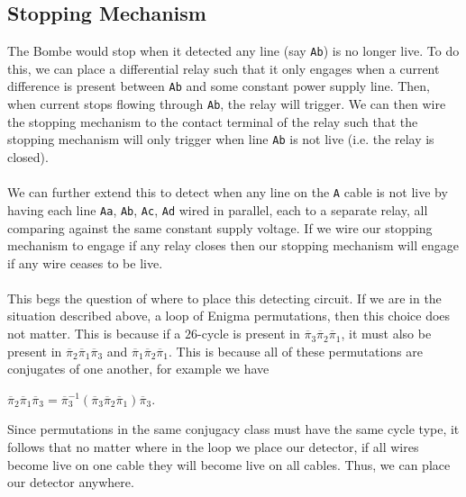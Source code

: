 \subsection{Stopping Mechanism}
The Bombe would stop when it detected
any line (say \texttt{Ab}) is no longer live. To do this, we can
place a differential
relay such that it only engages when a current difference is present
between \texttt{Ab} and some constant power supply line. Then, when
current stops
flowing through \texttt{Ab}, the relay will trigger. We can then wire the
stopping mechanism to the contact terminal of the relay such that the
stopping mechanism will only trigger when line \texttt{Ab} is not live (i.e.
the relay is closed).
\\\\We can further extend this to detect when any line on the \texttt{A}
cable is not live by having each line \texttt{Aa}, \texttt{Ab},
\texttt{Ac}, \texttt{Ad} wired in
parallel, each to a separate relay, all comparing against the same
constant supply voltage. If we wire our stopping mechanism to engage
if any relay closes
then our stopping mechanism will engage if any wire ceases to be live.
\\\\This begs the question of where to place this detecting circuit.
If we are in the situation described above, a loop of Enigma
permutations, then this choice does not matter. This is because if a
$26$-cycle is present in
$\overline\pi_3\overline\pi_2\overline\pi_1$, it must also
be present in
$\overline\pi_2\overline\pi_1\overline\pi_3$ and
$\overline\pi_1\overline\pi_2\overline\pi_1$. This is
because all of these permutations are conjugates of one another, for
example we have
\begin{center}
  $\overline\pi_2\overline\pi_1\overline\pi_3 =
  \overline\pi_3^{-1}(\overline\pi_3\overline\pi_2\overline\pi_1)\overline\pi_3$.
\end{center}
Since permutations in the same conjugacy class must have the same
cycle type, it follows that no matter where in the loop we place our
detector, if all wires become live on one cable they will become live
on all cables. Thus, we can place our detector anywhere.

